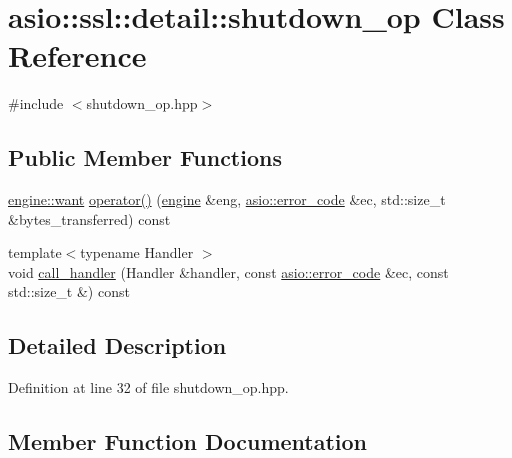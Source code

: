 \hypertarget{classasio_1_1ssl_1_1detail_1_1shutdown__op}{}\section{asio\+:\+:ssl\+:\+:detail\+:\+:shutdown\+\_\+op Class Reference}
\label{classasio_1_1ssl_1_1detail_1_1shutdown__op}


{\ttfamily \#include $<$shutdown\+\_\+op.\+hpp$>$}

\subsection*{Public Member Functions}
\begin{DoxyCompactItemize}
\item 
\hyperlink{classasio_1_1ssl_1_1detail_1_1engine_ab9812153941a6a93c9095f4e5ca8f915}{engine\+::want} \hyperlink{classasio_1_1ssl_1_1detail_1_1shutdown__op_ac405d44c5a25b87aad877f2b437efd3f}{operator()} (\hyperlink{classasio_1_1ssl_1_1detail_1_1engine}{engine} \&eng, \hyperlink{classasio_1_1error__code}{asio\+::error\+\_\+code} \&ec, std\+::size\+\_\+t \&bytes\+\_\+transferred) const 
\item 
{\footnotesize template$<$typename Handler $>$ }\\void \hyperlink{classasio_1_1ssl_1_1detail_1_1shutdown__op_a935d2d5686ac2ea17cc4f3e21835ef0a}{call\+\_\+handler} (Handler \&handler, const \hyperlink{classasio_1_1error__code}{asio\+::error\+\_\+code} \&ec, const std\+::size\+\_\+t \&) const 
\end{DoxyCompactItemize}


\subsection{Detailed Description}


Definition at line 32 of file shutdown\+\_\+op.\+hpp.



\subsection{Member Function Documentation}
\hypertarget{classasio_1_1ssl_1_1detail_1_1shutdown__op_a935d2d5686ac2ea17cc4f3e21835ef0a}{}
